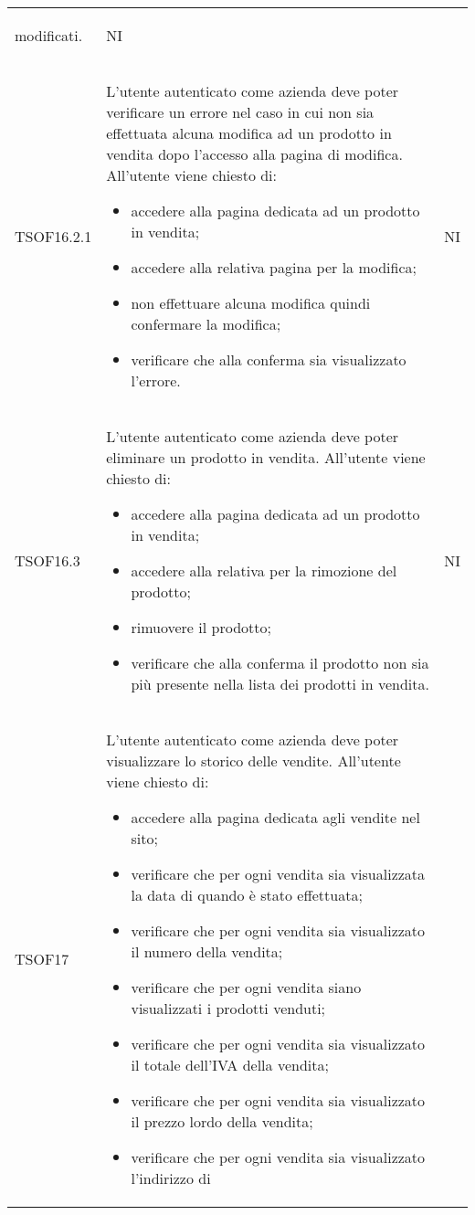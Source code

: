 \begin{table}[H]
\begin{longtable}{ >{\centering}p{} >{\centering}p{}
			>{\centering}p{}}
\begin{itemize}
			modificati.
		\end{itemize}	&	NI	\tabularnewline
		TSOF16.2.1	&	L'utente autenticato come azienda deve poter verificare un errore nel caso
		in cui non sia effettuata alcuna modifica ad un prodotto in vendita dopo
		l'accesso alla pagina di modifica. All'utente viene chiesto di:
		\begin{itemize}
			\item accedere alla pagina dedicata ad un prodotto in vendita;
			\item accedere alla relativa pagina per la modifica;
			\item non effettuare alcuna modifica quindi confermare la modifica;
			\item verificare che alla conferma sia visualizzato l'errore.
		\end{itemize}	&	NI	\tabularnewline
		TSOF16.3	&	L'utente autenticato come azienda deve poter eliminare
		un prodotto in vendita. All'utente viene chiesto di:
		\begin{itemize}
			\item accedere alla pagina dedicata ad un prodotto in vendita;
			\item accedere alla relativa per la rimozione del prodotto;
			\item rimuovere il prodotto;
			\item verificare che alla conferma il prodotto non sia più presente nella
			lista dei prodotti in vendita.
		\end{itemize}	&	NI	\tabularnewline
		TSOF17	&	L'utente autenticato come azienda deve poter visualizzare lo storico delle
		vendite. All'utente viene chiesto di:
		\begin{itemize}
			\item accedere alla pagina dedicata agli vendite nel sito;
			\item verificare che per ogni vendita sia visualizzata la data di quando
			è stato effettuata;
			\item verificare che per ogni vendita sia visualizzato il numero
			della vendita;
			\item verificare che per ogni vendita siano visualizzati i prodotti
			venduti;
			\item verificare che per ogni vendita sia visualizzato il totale dell'IVA
			della vendita;
			\item verificare che per ogni vendita sia visualizzato il prezzo
			lordo\glo{} della vendita;
			\item verificare che per ogni vendita sia visualizzato l'indirizzo di 

\end{itemize}
\end{longtable}
\end{table}

